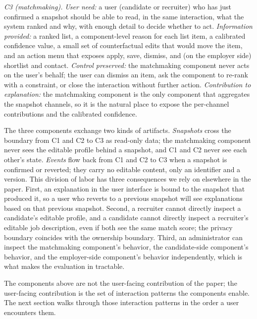 \emph{C3 (matchmaking).}
\emph{User need:} a user (candidate or recruiter) who has just confirmed a snapshot should be able to read, in the same interaction, what the system ranked and why, with enough detail to decide whether to act.
\emph{Information provided:} a ranked list, a component-level reason for each list item, a calibrated confidence value, a small set of counterfactual edits that would move the item, and an action menu that exposes apply, save, dismiss, and (on the employer side) shortlist and contact.
\emph{Control preserved:} the matchmaking component never acts on the user's behalf; the user can dismiss an item, ask the component to re-rank with a constraint, or close the interaction without further action.
\emph{Contribution to explanation:} the matchmaking component is the only component that aggregates the snapshot channels, so it is the natural place to expose the per-channel contributions and the calibrated confidence.

The three components exchange two kinds of artifacts.
\emph{Snapshots} cross the boundary from C1 and C2 to C3 as read-only data; the matchmaking component never sees the editable profile behind a snapshot, and C1 and C2 never see each other's state.
\emph{Events} flow back from C1 and C2 to C3 when a snapshot is confirmed or reverted; they carry no editable content, only an identifier and a version.
This division of labor has three consequences we rely on elsewhere in the paper.
First, an explanation in the user interface is bound to the snapshot that produced it, so a user who reverts to a previous snapshot will see explanations based on that previous snapshot.
Second, a recruiter cannot directly inspect a candidate's editable profile, and a candidate cannot directly inspect a recruiter's editable job description, even if both see the same match score; the privacy boundary coincides with the ownership boundary.
Third, an administrator can inspect the matchmaking component's behavior, the candidate-side component's behavior, and the employer-side component's behavior independently, which is what makes the evaluation in  tractable.

The components above are not the user-facing contribution of the paper; the user-facing contribution is the set of interaction patterns the components enable.
The next section walks through those interaction patterns in the order a user encounters them.
